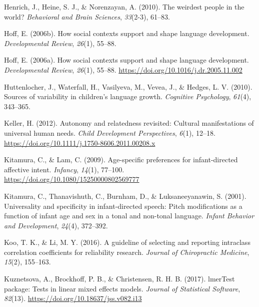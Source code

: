 \documentclass[
  ,man,floatsintext]{apa6}
\newlength{\cslhangindent}
\newlength{\cslentryspacingunit} %
\newenvironment{CSLReferences}[2] %
 {%
  \setlength{\parindent}{0pt}
  \ifodd #1
  \let\oldpar\par
  \def\par{\hangindent=\cslhangindent\oldpar}
  \fi
  \setlength{\parskip}{#2\cslentryspacingunit}
 }%
 {}
\begin{document}
\begin{CSLReferences}{1}{0}
\leavevmode{}%
Henrich, J., Heine, S. J., \& Norenzayan, A. (2010). The weirdest people in the world? \emph{Behavioral and Brain Sciences}, \emph{33}(2-3), 61--83.

\leavevmode{}%
Hoff, E. (2006b). How social contexts support and shape language development. \emph{Developmental Review}, \emph{26}(1), 55--88.

\leavevmode{}%
Hoff, E. (2006a). How social contexts support and shape language development. \emph{Developmental Review}, \emph{26}(1), 55--88. \url{https://doi.org/10.1016/j.dr.2005.11.002}

\leavevmode{}%
Huttenlocher, J., Waterfall, H., Vasilyeva, M., Vevea, J., \& Hedges, L. V. (2010). Sources of variability in children's language growth. \emph{Cognitive Psychology}, \emph{61}(4), 343--365.

\leavevmode{}%
Keller, H. (2012). Autonomy and relatedness revisited: Cultural manifestations of universal human needs. \emph{Child Development Perspectives}, \emph{6}(1), 12--18. \url{https://doi.org/10.1111/j.1750-8606.2011.00208.x}

\leavevmode{}%
Kitamura, C., \& Lam, C. (2009). Age-specific preferences for infant-directed affective intent. \emph{Infancy}, \emph{14}(1), 77--100. \url{https://doi.org/10.1080/15250000802569777}

\leavevmode{}%
Kitamura, C., Thanavishuth, C., Burnham, D., \& Luksaneeyanawin, S. (2001). Universality and specificity in infant-directed speech: Pitch modifications as a function of infant age and sex in a tonal and non-tonal language. \emph{Infant Behavior and Development}, \emph{24}(4), 372--392.

\leavevmode{}%
Koo, T. K., \& Li, M. Y. (2016). A guideline of selecting and reporting intraclass correlation coefficients for reliability research. \emph{Journal of Chiropractic Medicine}, \emph{15}(2), 155--163.

\leavevmode{}%
Kuznetsova, A., Brockhoff, P. B., \& Christensen, R. H. B. (2017). lmerTest package: Tests in linear mixed effects models. \emph{Journal of Statistical Software}, \emph{82}(13). \url{https://doi.org/10.18637/jss.v082.i13}


\end{CSLReferences}
\end{document}
